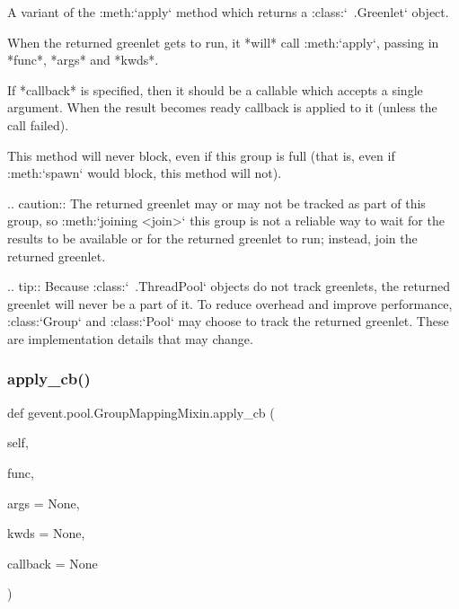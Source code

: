\begin{DoxyVerb}A variant of the :meth:`apply` method which returns a :class:`~.Greenlet` object.

When the returned greenlet gets to run, it *will* call :meth:`apply`,
passing in *func*, *args* and *kwds*.

If *callback* is specified, then it should be a callable which
accepts a single argument. When the result becomes ready
callback is applied to it (unless the call failed).

This method will never block, even if this group is full (that is,
even if :meth:`spawn` would block, this method will not).

.. caution:: The returned greenlet may or may not be tracked
   as part of this group, so :meth:`joining <join>` this group is
   not a reliable way to wait for the results to be available or
   for the returned greenlet to run; instead, join the returned
   greenlet.

.. tip:: Because :class:`~.ThreadPool` objects do not track greenlets, the returned
   greenlet will never be a part of it. To reduce overhead and improve performance,
   :class:`Group` and :class:`Pool` may choose to track the returned
   greenlet. These are implementation details that may change.
\end{DoxyVerb}
 \mbox{\label{classgevent_1_1pool_1_1_group_mapping_mixin_a3c630e95bd357dadd9dc1e1ab86acc8f}} 
\subsubsection{\texorpdfstring{apply\+\_\+cb()}{apply\_cb()}}
{\footnotesize\ttfamily def gevent.\+pool.\+Group\+Mapping\+Mixin.\+apply\+\_\+cb (\begin{DoxyParamCaption}\item[{}]{self,  }\item[{}]{func,  }\item[{}]{args = {\ttfamily None},  }\item[{}]{kwds = {\ttfamily None},  }\item[{}]{callback = {\ttfamily None} }\end{DoxyParamCaption})}

